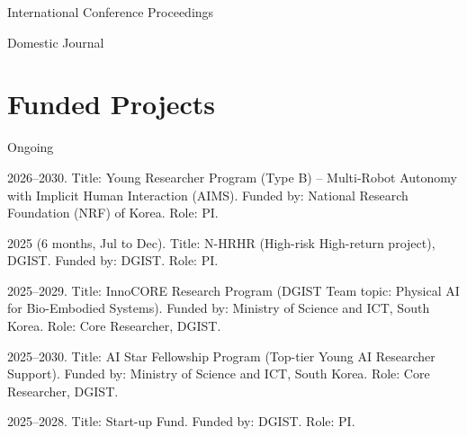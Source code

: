 \documentclass{cv} %
\begin{document}
\vspace{-2mm}
\begin{pubSubsectionNum}{International Conference Proceedings}
  \item {}
  \item {}
  \item {}
  \item {}
  \item {}
  \item {}
  \item {}
  \item {}
  \item {}
  \item {}
  \item {}
  \item {}
\end{pubSubsectionNum}

\vspace{-2mm}
\begin{pubSubsectionNum}{Domestic Journal}
  \item {}
\end{pubSubsectionNum}

\section{Funded Projects}

\vspace{1mm}
\begin{pubSubsectionNum}{Ongoing}
    \item 2026--2030. Title: Young Researcher Program (Type B) -- Multi-Robot Autonomy with Implicit Human Interaction (AIMS). Funded by: National Research Foundation (NRF) of Korea. Role: PI.
    \vspace{-1mm}
    \item 2025 (6 months, Jul to Dec). Title: N-HRHR (High-risk High-return project), DGIST. Funded by: DGIST. Role: PI.
    \vspace{-1mm}
    \item 2025--2029. Title: InnoCORE Research Program (DGIST Team topic: Physical AI for Bio-Embodied Systems). Funded by: Ministry of Science and ICT, South Korea. Role: Core Researcher, DGIST.
    \vspace{-1mm}
    \item 2025--2030. Title: AI Star Fellowship Program (Top-tier Young AI Researcher Support). Funded by: Ministry of Science and ICT, South Korea. Role: Core Researcher, DGIST.
    \vspace{-1mm}
    \item 2025--2028. Title: Start-up Fund. Funded by: DGIST. Role: PI.
    \vspace{-1mm}
\end{pubSubsectionNum}
\end{document}
